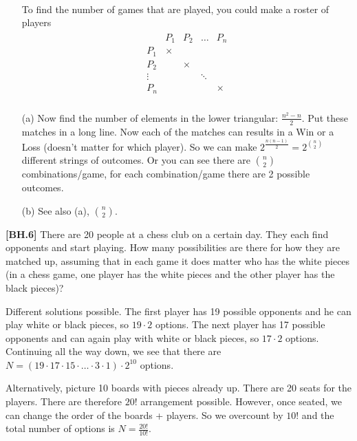 

\setcounter{theorem}{3}
\begin{exercise}[BH.1.4]
\begin{solution}~
	\begin{enumerate}
		\item[] To find the number of games that are played, you could make a roster of players
		\begin{align*}
			\begin{array}{ccccc}
				&P_{1} & P_{2} &\ldots &P_{n}\\
				P_{1} & \times \\
				P_{2} & & \times \\
				\vdots&&&\ddots\\
				P_{n} & & & &\times\\
				\end{array}
		\end{align*}
		\item[(a)] Now find the number of elements in the lower triangular: $\frac{n^2-n}{2}$. Put these matches in a long line. Now each of the matches can results in a Win or a Loss (doesn't matter for which player). So we can make $2^{\frac{n(n-1)}{2}}=2^{n\choose 2 }$ different strings of outcomes. Or you can see there are $n\choose 2$ combinations/game, for each combination/game there are 2 possible outcomes. 
	\item[(b)] See also (a), $n\choose 2$.
	\end{enumerate}
\end{solution}
\end{exercise}

\begin{exercise}\textbf{[BH.6]}
	There are 20 people at a chess club on a certain day. They each find opponents and start playing. How many possibilities are there for how they are matched up, assuming that in each game it does matter who has the white pieces (in a chess game, one player has the white pieces and the other player has the black pieces)?
\begin{solution}
	Different solutions possible. The first player has 19 possible opponents and he can play white or black pieces, so $19\cdot 2$ options. The next player has 17 possible opponents and can again play with white or black pieces, so $17\cdot 2$ options. Continuing all the way down, we see that there are $N=(19\cdot 17\cdot 15\cdot\ldots\cdot 3\cdot 1)\cdot 2^{10}$ options.

	Alternatively, picture 10 boards with pieces already up. There are 20 seats for the players. There are therefore $20!$ arrangement possible. However, once seated, we can change the order of the boards + players. So we overcount by $10!$ and the total number of options is $N=\frac{20!}{10!}$.
\end{solution}
\end{exercise}

